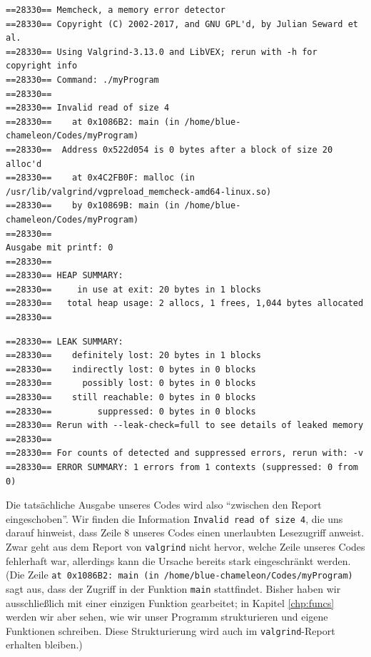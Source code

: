 \begin{cmdbox}
\begin{verbatim}
==28330== Memcheck, a memory error detector
==28330== Copyright (C) 2002-2017, and GNU GPL'd, by Julian Seward et al.
==28330== Using Valgrind-3.13.0 and LibVEX; rerun with -h for copyright info
==28330== Command: ./myProgram
==28330==
==28330== Invalid read of size 4
==28330==    at 0x1086B2: main (in /home/blue-chameleon/Codes/myProgram)
==28330==  Address 0x522d054 is 0 bytes after a block of size 20 alloc'd
==28330==    at 0x4C2FB0F: malloc (in /usr/lib/valgrind/vgpreload_memcheck-amd64-linux.so)
==28330==    by 0x10869B: main (in /home/blue-chameleon/Codes/myProgram)
==28330==
Ausgabe mit printf: 0
==28330==
==28330== HEAP SUMMARY:
==28330==     in use at exit: 20 bytes in 1 blocks
==28330==   total heap usage: 2 allocs, 1 frees, 1,044 bytes allocated
==28330==
\end{verbatim}
\end{cmdbox}

\begin{cmdbox}[]
\begin{verbatim}
==28330== LEAK SUMMARY:
==28330==    definitely lost: 20 bytes in 1 blocks
==28330==    indirectly lost: 0 bytes in 0 blocks
==28330==      possibly lost: 0 bytes in 0 blocks
==28330==    still reachable: 0 bytes in 0 blocks
==28330==         suppressed: 0 bytes in 0 blocks
==28330== Rerun with --leak-check=full to see details of leaked memory
==28330==
==28330== For counts of detected and suppressed errors, rerun with: -v
==28330== ERROR SUMMARY: 1 errors from 1 contexts (suppressed: 0 from 0)
\end{verbatim}
\end{cmdbox}

Die tatsächliche Ausgabe unseres Codes wird also \enquote{zwischen den Report eingeschoben}. Wir finden die Information \texttt{Invalid read of size 4}, die uns darauf hinweist, dass Zeile 8 unseres Codes einen unerlaubten Lesezugriff anweist. Zwar geht aus dem Report von \texttt{valgrind} nicht hervor, welche Zeile unseres Codes fehlerhaft war, allerdings kann die Ursache bereits stark eingeschränkt werden. (Die Zeile \texttt{at 0x1086B2: main (in /home/blue-chameleon/Codes/myProgram)} sagt aus, dass der Zugriff in der Funktion \texttt{main} stattfindet. Bisher haben wir ausschließlich mit einer einzigen Funktion gearbeitet; in Kapitel \ref{chp:funcs} werden wir aber sehen, wie wir unser Programm strukturieren und eigene Funktionen schreiben. Diese Strukturierung wird auch im \texttt{valgrind}-Report erhalten bleiben.)


